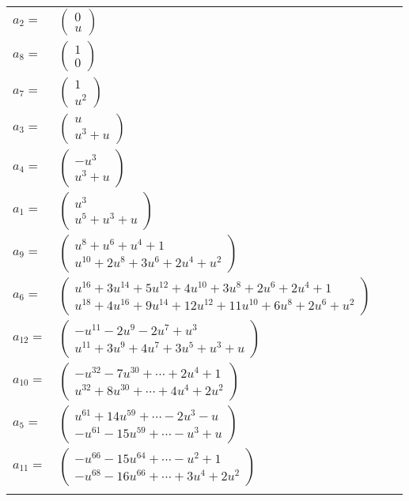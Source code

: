 \documentclass[1p]{elsarticle_modified}
\theoremstyle{definition}
\begin{document}
\begin{tabular}{m{7pt} m{180pt} m{7pt} m{180pt} }
\flushright $a_{2}=$&$\begin{pmatrix}0\\u\end{pmatrix}$ \\
\flushright $a_{8}=$&$\begin{pmatrix}1\\0\end{pmatrix}$ \\
\flushright $a_{7}=$&$\begin{pmatrix}1\\u^2\end{pmatrix}$ \\
\flushright $a_{3}=$&$\begin{pmatrix}u\\u^3+u\end{pmatrix}$ \\
\flushright $a_{4}=$&$\begin{pmatrix}- u^3\\u^3+u\end{pmatrix}$ \\
\flushright $a_{1}=$&$\begin{pmatrix}u^3\\u^5+u^3+u\end{pmatrix}$ \\
\flushright $a_{9}=$&$\begin{pmatrix}u^8+u^6+u^4+1\\u^{10}+2 u^8+3 u^6+2 u^4+u^2\end{pmatrix}$ \\
\flushright $a_{6}=$&$\begin{pmatrix}u^{16}+3 u^{14}+5 u^{12}+4 u^{10}+3 u^8+2 u^6+2 u^4+1\\u^{18}+4 u^{16}+9 u^{14}+12 u^{12}+11 u^{10}+6 u^8+2 u^6+u^2\end{pmatrix}$ \\
\flushright $a_{12}=$&$\begin{pmatrix}- u^{11}-2 u^9-2 u^7+u^3\\u^{11}+3 u^9+4 u^7+3 u^5+u^3+u\end{pmatrix}$ \\
\flushright $a_{10}=$&$\begin{pmatrix}- u^{32}-7 u^{30}+\cdots+2 u^4+1\\u^{32}+8 u^{30}+\cdots+4 u^4+2 u^2\end{pmatrix}$ \\
\flushright $a_{5}=$&$\begin{pmatrix}u^{61}+14 u^{59}+\cdots-2 u^3- u\\- u^{61}-15 u^{59}+\cdots- u^3+u\end{pmatrix}$ \\
\flushright $a_{11}=$&$\begin{pmatrix}- u^{66}-15 u^{64}+\cdots- u^2+1\\- u^{68}-16 u^{66}+\cdots+3 u^4+2 u^2\end{pmatrix}$\\&\end{tabular}
\end{document}

